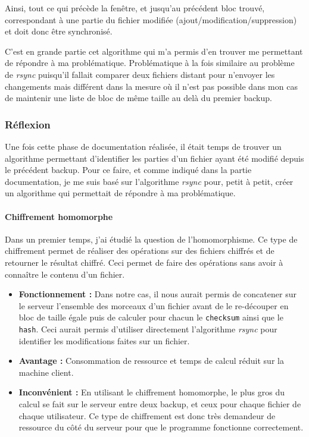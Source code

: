 \documentclass[a4paper,10pt, twoside]{report}
\begin{document}
\begin{spacing}{1.2}
Ainsi, tout ce qui pr\'ec\`ede la fen\^etre, et jusqu'au pr\'ec\'edent bloc
trouv\'e, correspondant \`a une partie du fichier modifi\'ee
(ajout/modification/suppression) et doit donc \^etre synchronis\'e.

C'est en grande partie cet algorithme qui m'a permis d'en trouver me permettant
de r\'epondre \`a ma probl\'ematique. Probl\'ematique \`a la fois similaire au
probl\`eme de \textit{rsync} puisqu'il fallait comparer deux fichiers distant
pour n'envoyer les changements mais diff\'erent dans la mesure o\`u il n'est
pas possible dans mon cas de maintenir une liste de bloc de m\^eme taille au
del\`a du premier backup.

\subsubsection{R\'eflexion}
Une fois cette phase de documentation r\'ealis\'ee, il \'etait temps de trouver
un algorithme permettant d'identifier les parties d'un fichier ayant \'et\'e
modifi\'e depuis le pr\'ec\'edent backup. Pour ce faire, et comme indiqu\'e
dans la partie documentation, je me suis bas\'e sur l'algorithme \textit{rsync}
pour, petit \`a petit, cr\'eer un algorithme qui permettait de r\'epondre \`a ma
probl\'ematique.

\paragraph{Chiffrement homomorphe}
Dans un premier temps, j'ai \'etudi\'e la question de l'homomorphisme. Ce type
de chiffrement permet de r\'ealiser des op\'erations sur des fichiers chiffr\'es
et de retourner le r\'esultat chiffr\'e. Ceci permet de faire des op\'erations
sans avoir \`a conna\^itre le contenu d'un fichier.

\begin{itemize}
 \item \textbf{Fonctionnement :} Dans notre cas, il nous aurait permis de
 concatener sur le serveur l'ensemble des morceaux d'un fichier avant de le
 re-d\'ecouper en bloc de taille \'egale puis de calculer pour chacun le
 \texttt{checksum} ainsi que le \texttt{hash}. Ceci aurait permis d'utiliser
 directement l'algorithme \textit{rsync} pour identifier les modifications
 faites sur un fichier.

 \item \textbf{Avantage :} Consommation de ressource et temps de calcul
 r\'eduit sur la machine client.
 
 \item \textbf{Inconv\'enient :} En utilisant le chiffrement homomorphe, le
 plus gros du calcul se fait sur le serveur entre deux backup, et ceux pour
 chaque fichier de chaque utilisateur. Ce type de chiffrement est donc tr\`es
 demandeur de ressource du c\^ot\'e du serveur pour que le programme fonctionne
 correctement.


\end{itemize}
\end{spacing}
\end{document}
